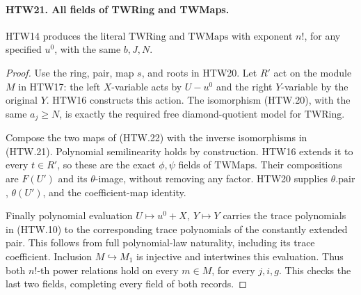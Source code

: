 \paragraph{HTW21. All fields of TWRing and TWMaps.}
\label{claim:HTW21}
HTW14 produces the literal \(\mathrm{TWRing}\)
and \(\mathrm{TWMaps}\) with exponent \(n!\), for
any specified \(u^0\), with the same \(b,J,N\).
\begin{proof}
Use the ring, pair, map \(s\), and roots in HTW20.
Let \(R'\) act on the module \(M\) in HTW17:
the left \(X\)-variable acts by \(U-u^0\) and
the right \(Y\)-variable by the original \(Y\).
HTW16 constructs this action.  The isomorphism
(HTW.20), with the same \(a_j\ge N\), is exactly
the required free diamond-quotient model for
\(\mathrm{TWRing}\).

Compose the two maps of (HTW.22) with the inverse
isomorphisms in (HTW.21).  Polynomial
semilinearity holds by construction.  HTW16
extends it to every \(t\in R'\), so these are
the exact \(\phi,\psi\) fields of \(\mathrm{TWMaps}\).
Their compositions are \(F(U')\) and its
\(\theta\)-image, without removing any factor.
HTW20 supplies \(\theta.\mathrm{pair}\),
\(\theta(U')\), and the coefficient-map identity.

Finally polynomial evaluation
\(U\mapsto u^0+X,\ Y\mapsto Y\) carries the
trace polynomials in (HTW.10) to the corresponding
trace polynomials of the constantly extended
pair.  This follows from full polynomial-law
naturality, including its trace coefficient.
Inclusion \(M\hookrightarrow M_1\) is injective
and intertwines this evaluation.  Thus both
\(n!\)-th power relations hold on every \(m\in M\),
for every \(j,i,g\).  This checks the last two
fields, completing every field of both records.
\end{proof}

